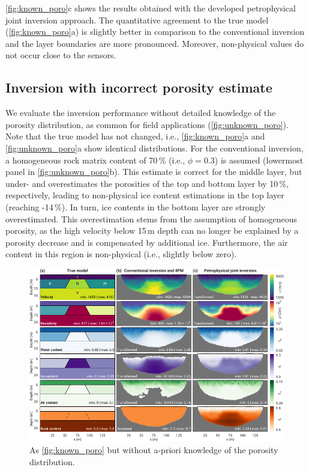 \documentclass[extra]{gji}
\begin{document}
\autoref{fig:known_poro}c shows the results obtained with the developed petrophysical joint inversion approach.
The quantitative agreement to the true model (\autoref{fig:known_poro}a) is slightly better in comparison to the conventional inversion and the layer boundaries are more pronounced.
Moreover, non-physical values do not occur close to the sensors.

\subsection{Inversion with incorrect porosity estimate}

We evaluate the inversion performance without detailed knowledge of the porosity distribution, as common for field applications (\autoref{fig:unknown_poro}).
Note that the true model has not changed, i.e., \autoref{fig:known_poro}a and \autoref{fig:unknown_poro}a show identical distributions.
For the conventional inversion, a homogeneous rock matrix content of 70\,\% (i.e., $\phi = 0.3$) is assumed (lowermost panel in \autoref{fig:unknown_poro}b).
This estimate is correct for the middle layer, but under- and overestimates the porosities of the top and bottom layer by 10\,\%, respectively, leading to non-physical ice content estimations in the top layer (reaching -14\,\%).
In turn, ice contents in the bottom layer are strongly overestimated.
This overestimation stems from the assumption of homogeneous porosity, as the high velocity below 15\,m depth can no longer be explained by a porosity decrease and is compensated by additional ice.
Furthermore, the air content in this region is non-physical (i.e., slightly below zero).

\begin{figure}
 \centering
 \includegraphics[width=\textwidth]{./Fig3_two_columns}
 \caption{As \autoref{fig:known_poro} but without a-priori knowledge of the porosity distribution.}
 \label{fig:unknown_poro}
\end{figure}
\end{document}
